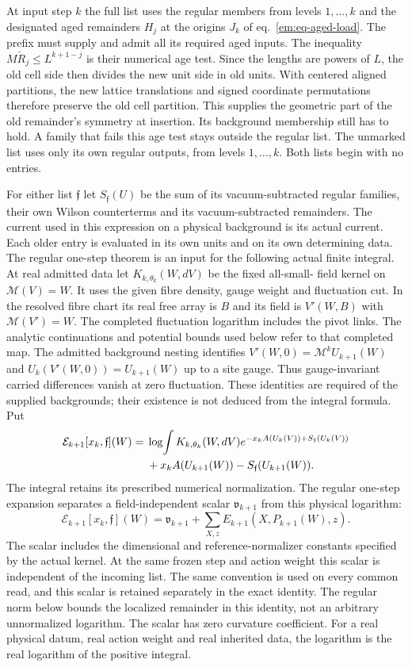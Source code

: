 \documentclass[11pt,letterpaper,reqno]{amsart}
\numberwithin{equation}{section}
\renewcommand{\eqref}[1]{\textup{eq.~\ref{#1}}}
\theoremstyle{definition}
\theoremstyle{remark}
\begin{document}
At input step $k$ the full list uses the regular members from levels
$1,\ldots,k$ and the designated aged remainders $H_j$ at the origins
$J_k$ of \eqref{em:eq-aged-load}. The prefix must supply and admit all
its required aged inputs. The inequality $M\check R_j\le L^{k+1-j}$
is their numerical age test.
Since the lengths are powers of $L$, the old cell side then divides
the new unit side in old units. With centered aligned partitions, the
new lattice translations and signed coordinate permutations therefore
preserve the old cell partition. This supplies the geometric part of
the old remainder's symmetry at insertion. Its background membership
still has to hold. A family that fails this age test stays outside the
regular list. The unmarked list uses only its own regular outputs, from
levels $1,\ldots,k$. Both lists begin with no entries.

For either list $\mathfrak f$ let $S_{\mathfrak f}(U)$ be the sum of its
vacuum-subtracted regular families, their own Wilson counterterms and
its vacuum-subtracted remainders. The current used in this expression
on a physical background is its actual current. Each older entry is
evaluated in its own units and on its own determining data. The regular
one-step theorem is an input for the following actual finite integral.
At real admitted data let $K_{k,\theta_k}(W,dV)$ be the fixed all-small-
field kernel on $\mathcal M(V)=W$. It uses the given fibre density,
gauge weight and fluctuation cut. In the resolved fibre chart its real
free array is $B$ and its field is $V'(W,B)$ with $\mathcal M(V')=W$.
The completed fluctuation logarithm includes the pivot links. The
analytic continuations and potential bounds used below refer to that
completed map. The admitted background nesting identifies
$V'(W,0)=\mathcal M^kU_{k+1}(W)$ and
$U_k(V'(W,0))=U_{k+1}(W)$ up to a site gauge. Thus gauge-invariant
carried differences vanish at zero fluctuation. These identities
are required of the supplied backgrounds; their existence is not
deduced from the integral formula. Put
\begin{align}
 \mathcal E_{k+1}[x_k,\mathfrak f](W)
  ={}&\log\!\int K_{k,\theta_k}(W,dV)
          e^{-x_k A(U_k(V))+S_{\mathfrak f}(U_k(V))}\notag\\
     &+x_k A(U_{k+1}(W))-S_{\mathfrak f}(U_{k+1}(W)).
 \label{em:eq-actual-step}
\end{align}
The integral retains its prescribed numerical normalization. The
regular one-step expansion separates a field-independent scalar
$\mathfrak v_{k+1}$ from this physical logarithm:
\[
 \mathcal E_{k+1}[x_k,\mathfrak f](W)
   =\mathfrak v_{k+1}+\sum_{X,z}E_{k+1}(X,P_{k+1}(W),z).
\]
The scalar includes the dimensional and reference-normalizer
constants specified by the actual kernel. At the same frozen step
and action weight this scalar is independent of the incoming list.
The same convention is used on every common read, and this scalar is
retained separately in the exact identity. The regular norm below
bounds the localized remainder in this identity, not an arbitrary
unnormalized logarithm. The scalar has zero curvature coefficient.
For a real physical datum, real action weight and real inherited
data, the logarithm is the real logarithm of the positive integral.
\end{document}
